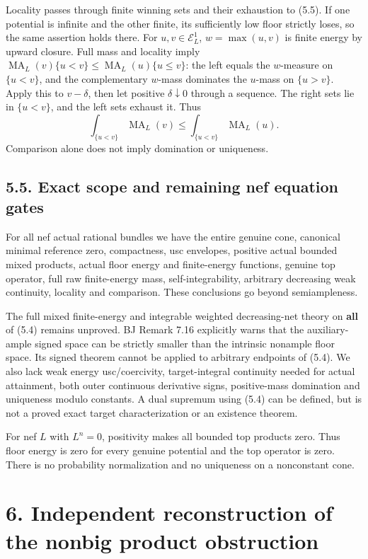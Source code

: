 \documentclass[
  10pt,
]{article}
\begin{document}
Locality passes through finite winning sets and their exhaustion to
(5.5). If one potential is infinite and the other finite, its
sufficiently low floor strictly loses, so the same assertion holds
there. For \(u,v\in\mathcal E^1_L\), \(w=\max(u,v)\) is finite energy by
upward closure. Full mass and locality imply
\(\operatorname{MA}_L(v)\{u<v\}\le\operatorname{MA}_L(u)\{u\le v\}\):
the left equals the \(w\)-measure on \(\{u<v\}\), and the complementary
\(w\)-mass dominates the \(u\)-mass on \(\{u>v\}\). Apply this to
\(v-\delta\), then let positive \(\delta\downarrow0\) through a
sequence. The right sets lie in \(\{u<v\}\), and the left sets exhaust
it. Thus \[\int_{\{u<v\}}\operatorname{MA}_L(v)
\le\int_{\{u<v\}}\operatorname{MA}_L(u). \tag{5.11}\] Comparison alone
does not imply domination or uniqueness.

\subsection{5.5. Exact scope and remaining nef equation
gates}\label{exact-scope-and-remaining-nef-equation-gates}

For all nef actual rational bundles we have the entire genuine cone,
canonical minimal reference zero, compactness, usc envelopes, positive
actual bounded mixed products, actual floor energy and finite-energy
functions, genuine top operator, full raw finite-energy mass,
self-integrability, arbitrary decreasing weak continuity, locality and
comparison. These conclusions go beyond semiampleness.

The full mixed finite-energy and integrable weighted decreasing-net
theory on \textbf{all} of (5.4) remains unproved. BJ Remark 7.16
explicitly warns that the auxiliary-ample signed space can be strictly
smaller than the intrinsic nonample floor space. Its signed theorem
cannot be applied to arbitrary endpoints of (5.4). We also lack weak
energy usc/coercivity, target-integral continuity needed for actual
attainment, both outer continuous derivative signs, positive-mass
domination and uniqueness modulo constants. A dual supremum using (5.4)
can be defined, but is not a proved exact target characterization or an
existence theorem.

For nef \(L\) with \(L^n=0\), positivity makes all bounded top products
zero. Thus floor energy is zero for every genuine potential and the top
operator is zero. There is no probability normalization and no
uniqueness on a nonconstant cone.

\section{6. Independent reconstruction of the nonbig product
obstruction}\label{independent-reconstruction-of-the-nonbig-product-obstruction}
\end{document}
